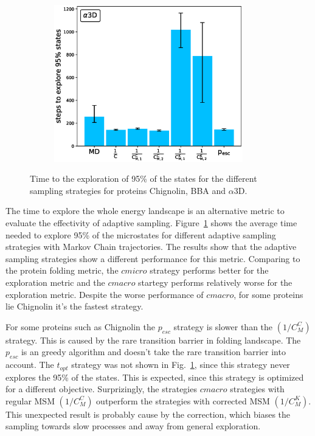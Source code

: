 \begin{figure}[H]
\begin{subfigure}[t]{0.5\textwidth}
    \includegraphics[width=0.9\textwidth]{figures/A3D_7_steps10000_nparallel100_explore.eps}   
  \end{subfigure}
  \caption{Time to the exploration of 95\% of the states for the different sampling strategies for proteins Chignolin, BBA and $\alpha$3D.}
  \label{fig:Time_explore}
\end{figure}

The time to explore the whole energy landscape is an alternative metric to evaluate the effectivity of adaptive sampling. Figure~\ref{fig:Time_explore} shows the average time needed to explore 95\% of the microstates for different adaptive sampling strategies with Markov Chain trajectories.
The results show that the adaptive sampling strategies show a different performance for this metric. Comparing to the protein folding metric, the $cmicro$ strategy performs better for the exploration metric and the $cmacro$  startegy performs relatively worse for the exploration metric. Despite the worse performance of $cmacro$, for some proteins lie Chignolin it's the fastest strategy. 


For some proteins such as Chignolin the $p_{esc}$ strategy is slower than the $(1/C_M^C)$ strategy. This is caused by the rare transition barrier in folding landscape. The $p_{esc}$ is an greedy algorithm and doesn't take the rare transition barrier into account. The $t_{opt}$ strategy was not shown in Fig.~\ref{fig:Time_explore}, since this strategy never explores the 95\% of the states. This is expected, since this strategy is optimized for a different objective.
Surprizingly, the strategies $cmacro$ strategies with regular MSM $(1/C_M^C)$ outperform
the strategies with corrected MSM $(1/C_M^K)$. This unexpected result is probably cause by the correction, which biases the sampling towards slow processes and away from general exploration.

